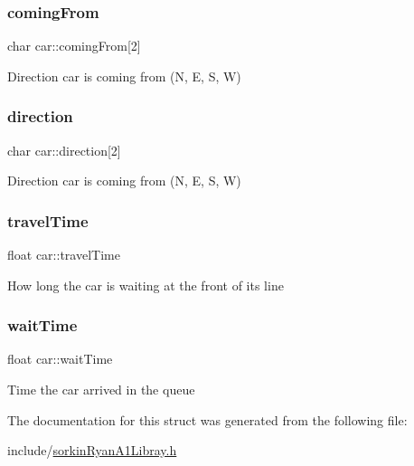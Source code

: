 \subsubsection{\texorpdfstring{coming\+From}{comingFrom}}
{\footnotesize\ttfamily char car\+::coming\+From\mbox{[}2\mbox{]}}

Direction car is coming from (N, E, S, W) \mbox{\label{structcar_a38d24547773184258c1f98335a440e1c}} 
\subsubsection{\texorpdfstring{direction}{direction}}
{\footnotesize\ttfamily char car\+::direction\mbox{[}2\mbox{]}}

Direction car is coming from (N, E, S, W) \mbox{\label{structcar_a75e54f35b43292e1e2a30e54627d20ea}} 
\subsubsection{\texorpdfstring{travel\+Time}{travelTime}}
{\footnotesize\ttfamily float car\+::travel\+Time}

How long the car is waiting at the front of its line \mbox{\label{structcar_a166a1d2ea40ef5977d26c3761a2a39c8}} 
\subsubsection{\texorpdfstring{wait\+Time}{waitTime}}
{\footnotesize\ttfamily float car\+::wait\+Time}

Time the car arrived in the queue 

The documentation for this struct was generated from the following file\+:\begin{DoxyCompactItemize}
\item 
include/\hyperlink{sorkinRyanA1Libray_8h}{sorkin\+Ryan\+A1\+Libray.\+h}\end{DoxyCompactItemize}

